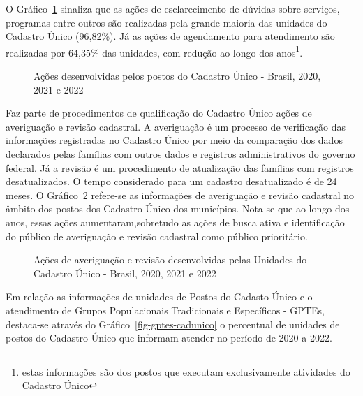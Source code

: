 \documentclass[
  letterpaper,
  DIV=11,
  numbers=noendperiod]{scrreprt}
\begin{document}
O Gráfico~\ref{fig-acoes_cad} sinaliza que as ações de esclarecimento de
dúvidas sobre serviços, programas entre outros são realizadas pela
grande maioria das unidades do Cadastro Único (96,82\%). Já as ações de
agendamento para atendimento são realizadas por 64,35\% das unidades,
com redução ao longo dos anos\footnote{estas informações são dos postos
  que executam exclusivamente atividades do Cadastro Único}.

\begin{figure}


\caption{\label{fig-acoes_cad}Ações desenvolvidas pelos postos do
Cadastro Único - Brasil, 2020, 2021 e 2022}

\end{figure}%

Faz parte de procedimentos de qualificação do Cadastro Único ações de
averiguação e revisão cadastral. A averiguação é um processo de
verificação das informações registradas no Cadastro Único por meio da
comparação dos dados declarados pelas famílias com outros dados e
registros administrativos do governo federal. Já a revisão é um
procedimento de atualização das famílias com registros desatualizados. O
tempo considerado para um cadastro desatualizado é de 24 meses. O
Gráfico~\ref{fig-ave_cad} refere-se as informações de averiguação e
revisão cadastral no âmbito dos postos dos Cadastro Único dos
municípios. Nota-se que ao longo dos anos, essas ações
aumentaram,sobretudo as ações de busca ativa e identificação do público
de averiguação e revisão cadastral como público prioritário.

\begin{figure}


\caption{\label{fig-ave_cad}Ações de averiguação e revisão desenvolvidas
pelas Unidades do Cadastro Único - Brasil, 2020, 2021 e 2022}

\end{figure}%

Em relação as informações de unidades de Postos do Cadasto Único e o
atendimento de Grupos Populacionais Tradicionais e Específicos - GPTEs,
destaca-se através do Gráfico~\ref{fig-gptes-cadunico} o percentual de
unidades de postos do Cadastro Único que informam atender no período de
2020 a 2022.
\end{document}
